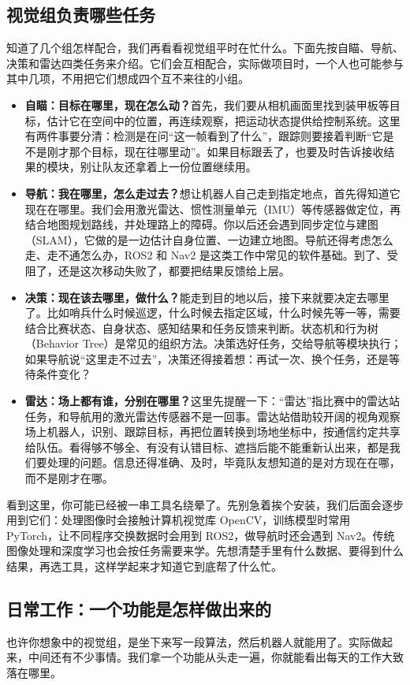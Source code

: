 \subsection*{视觉组负责哪些任务}
知道了几个组怎样配合，我们再看看视觉组平时在忙什么。下面先按自瞄、导航、决策和雷达四类任务来介绍。它们会互相配合，实际做项目时，一个人也可能参与其中几项，不用把它们想成四个互不来往的小组。

\begin{itemize}
    \item \textbf{自瞄：目标在哪里，现在怎么动？}首先，我们要从相机画面里找到装甲板等目标，估计它在空间中的位置，再连续观察，把运动状态提供给控制系统。这里有两件事要分清：检测是在问“这一帧看到了什么”，跟踪则要接着判断“它是不是刚才那个目标，现在往哪里动”。如果目标跟丢了，也要及时告诉接收结果的模块，别让队友还拿着上一份位置继续用。
    \item \textbf{导航：我在哪里，怎么走过去？}想让机器人自己走到指定地点，首先得知道它现在在哪里。我们会用激光雷达、惯性测量单元（IMU）等传感器做定位，再结合地图规划路线，并处理路上的障碍。你以后还会遇到同步定位与建图（SLAM），它做的是一边估计自身位置、一边建立地图。导航还得考虑怎么走、走不通怎么办，ROS2 和 Nav2 是这类工作中常见的软件基础。到了、受阻了，还是这次移动失败了，都要把结果反馈给上层。
    \item \textbf{决策：现在该去哪里，做什么？}能走到目的地以后，接下来就要决定去哪里了。比如哨兵什么时候巡逻，什么时候去指定区域，什么时候先等一等，需要结合比赛状态、自身状态、感知结果和任务反馈来判断。状态机和行为树（Behavior Tree）是常见的组织方法。决策选好任务，交给导航等模块执行；如果导航说“这里走不过去”，决策还得接着想：再试一次、换个任务，还是等待条件变化？
    \item \textbf{雷达：场上都有谁，分别在哪里？}这里先提醒一下：“雷达”指比赛中的雷达站任务，和导航用的激光雷达传感器不是一回事。雷达站借助较开阔的视角观察场上机器人，识别、跟踪目标，再把位置转换到场地坐标中，按通信约定共享给队伍。看得够不够全、有没有认错目标、遮挡后能不能重新认出来，都是我们要处理的问题。信息还得准确、及时，毕竟队友想知道的是对方现在在哪，而不是刚才在哪。
\end{itemize}

看到这里，你可能已经被一串工具名绕晕了。先别急着挨个安装，我们后面会逐步用到它们：处理图像时会接触计算机视觉库 OpenCV，训练模型时常用 PyTorch，让不同程序交换数据时会用到 ROS2，做导航时还会遇到 Nav2。传统图像处理和深度学习也会按任务需要来学。先想清楚手里有什么数据、要得到什么结果，再选工具，这样学起来才知道它到底帮了什么忙。

\subsection*{日常工作：一个功能是怎样做出来的}
也许你想象中的视觉组，是坐下来写一段算法，然后机器人就能用了。实际做起来，中间还有不少事情。我们拿一个功能从头走一遍，你就能看出每天的工作大致落在哪里。

